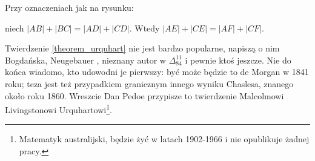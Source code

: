 %

\begin{theorem}[Urquharta]
\label{theorem_urquhart}%
%
    Przy oznaczeniach jak na rysunku:
    \begin{center}
\begin{comment}
    \begin{tikzpicture}[scale=.4]
        \tkzDefPoint(0, 0){E}
        \tkzDefPoint(267:5){E1}
        \tkzDefPoint(250:5){E2}
        \tkzDefPoint(165:5){E3}
        \tkzDefPoint(135:5){E4}
        
        \tkzDefLine[tangent at=E1](E) \tkzGetPoint{tan1}
        \tkzDefLine[tangent at=E2](E) \tkzGetPoint{tan2}
        \tkzDefLine[tangent at=E3](E) \tkzGetPoint{tan3}
        \tkzDefLine[tangent at=E4](E) \tkzGetPoint{tan4}
        
        \tkzInterLL(E4,tan4)(E1,tan1) \tkzGetPoint{S1}
        \tkzInterLL(E4,tan4)(E2,tan2) \tkzGetPoint{S2}
        \tkzInterLL(E3,tan3)(E1,tan1) \tkzGetPoint{S3}
        \tkzInterLL(E3,tan3)(E2,tan2) \tkzGetPoint{S4}

        \tkzInterLL(S3,S4)(S1,S2) \tkzGetPoint{Gorny}
        \tkzInterLL(S1,S3)(S2,S4) \tkzGetPoint{Dolny}

        \tkzLabelPoint[below](S1){$A$}
        \tkzLabelPoint[above left](S2){$D$}
        \tkzLabelPoint(S3){$B$}
        \tkzLabelPoint[above right](S4){$C$}
        \tkzLabelPoint(Dolny){$E$}
        \tkzLabelPoint[right](Gorny){$F$}

        \tkzDrawSegments[line width=0.2mm](S1,Dolny S1,Gorny S3,Gorny S2,Dolny)
        \tkzDrawPoints[size=3,color=black,fill=black!50](S1,S2,S3,S4,Dolny,Gorny)
\end{tikzpicture}
\end{comment}
    \end{center}
    niech $|AB| + |BC| = |AD| + |CD|$.
    Wtedy $|AE| + |CE| = |AF| + |CF|$.
\end{theorem}

Twierdzenie \ref{theorem_urquhart} nie jest bardzo popularne, napiszą o nim Bogdańska, Neugebauer \cite[s. 97]{neugebauer_2018}, nieznany autor w $\Delta_{84}^{11}$ i pewnie ktoś jeszcze.
Nie do końca wiadomo, kto udowodni je pierwszy: być może będzie to de Morgan w 1841 roku; teza jest też przypadkiem granicznym innego wyniku Chaslesa, znanego około roku 1860.
Wreszcie Dan Pedoe \cite{pedoe_1976} przypisze to twierdzenie Malcolmowi Livingstonowi Urquhartowi\footnote{Matematyk australijski, będzie żyć w latach 1902-1966 i nie opublikuje żadnej pracy.}.
%
%

%